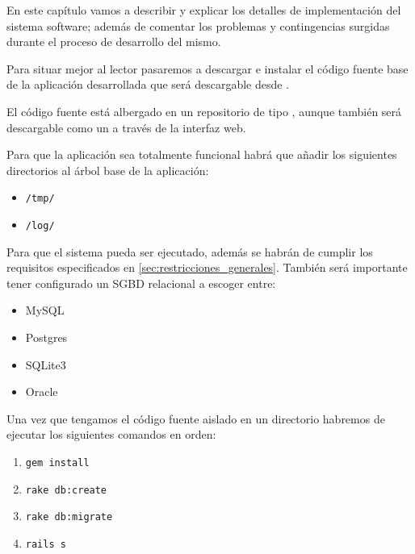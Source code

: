 
En este capítulo vamos a describir y explicar los detalles de implementación del
sistema software; además de comentar los problemas y contingencias surgidas
durante el proceso de desarrollo del mismo.

Para situar mejor al lector pasaremos a descargar e instalar el código fuente
base de la aplicación desarrollada que será descargable desde
\cite{cod:pfc_sfo}.

El código fuente está albergado en un repositorio de tipo , aunque
también será descargable como un  a través de la interfaz web.

Para que la aplicación sea totalmente funcional habrá que añadir los siguientes
directorios al árbol base de la aplicación:

\begin{itemize}
\item \texttt{/tmp/}
\item \texttt{/log/}
\end{itemize}

Para que el sistema pueda ser ejecutado, además se habrán de cumplir los
requisitos especificados en \ref{sec:restricciones_generales}. También será
importante tener configurado un SGBD relacional a escoger entre:

\begin{itemize}
\item MySQL
\item Postgres
\item SQLite3
\item Oracle
\end{itemize}

Una vez que tengamos el código fuente aislado en un directorio habremos de
ejecutar los siguientes comandos en orden:

\begin{enumerate}
\item \texttt{gem install}
\item \texttt{rake db:create}
\item \texttt{rake db:migrate}
\item \texttt{rails s}
\end{enumerate}

